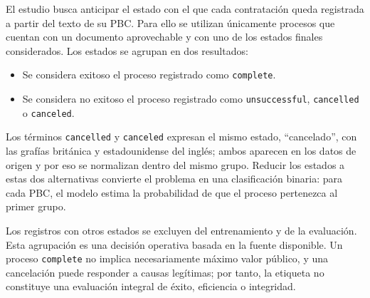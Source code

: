 El estudio busca anticipar el estado con el que cada contratación queda registrada a partir del texto de su PBC. Para ello se utilizan únicamente procesos que cuentan con un documento aprovechable y con uno de los estados finales considerados. Los estados se agrupan en dos resultados:

\begin{itemize}
  \item Se considera exitoso el proceso registrado como \texttt{complete}.
  \item Se considera no exitoso el proceso registrado como \texttt{unsuccessful}, \texttt{cancelled} o \texttt{canceled}.
\end{itemize}

Los términos \texttt{cancelled} y \texttt{canceled} expresan el mismo estado, ``cancelado'', con las grafías británica y estadounidense del inglés; ambos aparecen en los datos de origen y por eso se normalizan dentro del mismo grupo. Reducir los estados a estas dos alternativas convierte el problema en una clasificación binaria: para cada PBC, el modelo estima la probabilidad de que el proceso pertenezca al primer grupo.

Los registros con otros estados se excluyen del entrenamiento y de la evaluación. Esta agrupación es una decisión operativa basada en la fuente disponible. Un proceso \texttt{complete} no implica necesariamente máximo valor público, y una cancelación puede responder a causas legítimas; por tanto, la etiqueta no constituye una evaluación integral de éxito, eficiencia o integridad.
